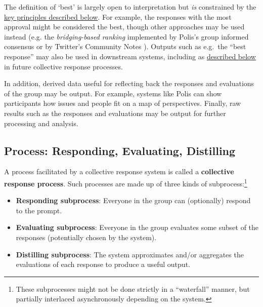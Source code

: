 \documentclass[sigconf,authorversion,nonacm,linkcolor=blue,colorlinks]{acmart}
\def\tightlist{} %
\begin{document}
The definition of `best' is largely open to interpretation but \emph{is} constrained by the \hyperlink{key-principles}{key principles described below}. %
For example, the responses with the most approval might be considered the best, though other approaches may be used instead (e.g. the \emph{bridging-based ranking} \cite{ovadya2022bridging} implemented by Polis's group informed consensus \cite{smallPolis2021} or by Twitter's Community 
Notes \cite{wojcikBirdwatchCrowdWisdom}). Outputs such as e.g.~the ``best response'' may also be used in downstream systems, including as \hyperlink{collective-dialogue}{described below} in future collective response processes.%

In addition, derived data useful for reflecting back the responses and evaluations of the group may be output. For example, systems like Polis can show participants how issues and people fit on a map of perspectives.
Finally, raw results such as the responses and evaluations may be output for further processing and analysis. %


\hypertarget{Process}{%
\subsection{\textbf{Process}: Responding, Evaluating, Distilling}\label{process}}

A process facilitated by a collective response system is called a \textbf{collective response process}. Such processes are made up of three kinds of subprocess:\footnote{These subprocesses might not be done strictly in a ``waterfall'' manner, but partially interlaced asynchronously depending on the system.}

\begin{itemize}
\tightlist
\item
  \textbf{Responding subprocess}: Everyone in the group can (optionally) respond to the prompt. 
\item
  \textbf{Evaluating subprocess}: Everyone in the group evaluates some subset of the responses (potentially chosen by the system).
\item
  \textbf{Distilling subprocess}: The system approximates and/or aggregates the evaluations of each response to produce a useful output.
\end{itemize}
\end{document}
